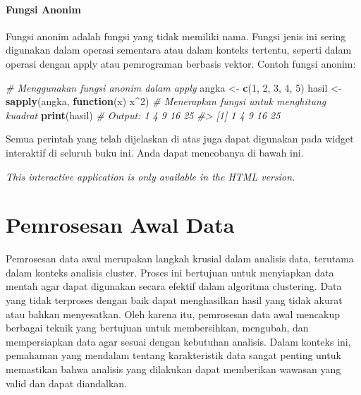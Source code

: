 \documentclass[
  oneside]{book}
\newenvironment{Shaded}{\begin{snugshade}}{\end{snugshade}}
\newcommand{\CommentTok}[1]{\textcolor[rgb]{0.56,0.35,0.01}{\textit{#1}}}
\newcommand{\ControlFlowTok}[1]{\textcolor[rgb]{0.13,0.29,0.53}{\textbf{#1}}}
\newcommand{\DecValTok}[1]{\textcolor[rgb]{0.00,0.00,0.81}{#1}}
\newcommand{\FunctionTok}[1]{\textcolor[rgb]{0.13,0.29,0.53}{\textbf{#1}}}
\newcommand{\NormalTok}[1]{#1}
\newcommand{\OtherTok}[1]{\textcolor[rgb]{0.56,0.35,0.01}{#1}}
\newcommand{\SpecialCharTok}[1]{\textcolor[rgb]{0.81,0.36,0.00}{\textbf{#1}}}
\begin{document}
\subsubsection*{Fungsi Anonim}\label{fungsi-anonim}

Fungsi anonim adalah fungsi yang tidak memiliki nama. Fungsi jenis ini
sering digunakan dalam operasi sementara atau dalam konteks tertentu,
seperti dalam operasi dengan apply atau pemrograman berbasis vektor.
Contoh fungsi anonim:

\begin{Shaded}
\begin{Highlighting}[]
\CommentTok{\# Menggunakan fungsi anonim dalam apply}
\NormalTok{angka }\OtherTok{\textless{}{-}} \FunctionTok{c}\NormalTok{(}\DecValTok{1}\NormalTok{, }\DecValTok{2}\NormalTok{, }\DecValTok{3}\NormalTok{, }\DecValTok{4}\NormalTok{, }\DecValTok{5}\NormalTok{)}
\NormalTok{hasil }\OtherTok{\textless{}{-}} \FunctionTok{sapply}\NormalTok{(angka, }\ControlFlowTok{function}\NormalTok{(x) x}\SpecialCharTok{\^{}}\DecValTok{2}\NormalTok{)  }\CommentTok{\# Menerapkan fungsi untuk menghitung kuadrat}
\FunctionTok{print}\NormalTok{(hasil)  }\CommentTok{\# Output: 1 4 9 16 25}
\CommentTok{\#\textgreater{} [1]  1  4  9 16 25}
\end{Highlighting}
\end{Shaded}

Semua perintah yang telah dijelaskan di atas juga dapat digunakan pada
widget interaktif di seluruh buku ini. Anda dapat mencobanya di bawah
ini.

\begin{center}
\textit{This interactive application is only available in the HTML version.}
\end{center}

\chapter{Pemrosesan Awal Data}\label{pad}

Pemrosesan data awal merupakan langkah krusial dalam analisis data, terutama dalam konteks analisis cluster. Proses ini bertujuan untuk menyiapkan data mentah agar dapat digunakan secara efektif dalam algoritma clustering. Data yang tidak terproses dengan baik dapat menghasilkan hasil yang tidak akurat atau bahkan menyesatkan. Oleh karena itu, pemrosesan data awal mencakup berbagai teknik yang bertujuan untuk membersihkan, mengubah, dan mempersiapkan data agar sesuai dengan kebutuhan analisis. Dalam konteks ini, pemahaman yang mendalam tentang karakteristik data sangat penting untuk memastikan bahwa analisis yang dilakukan dapat memberikan wawasan yang valid dan dapat diandalkan.
\end{document}

